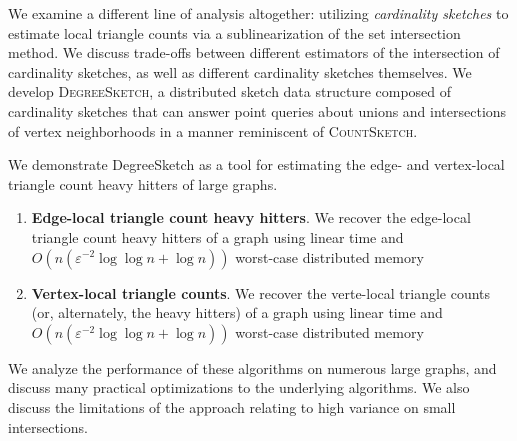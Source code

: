 \documentclass{report}
\newcommand{\algoname}[1]{\textnormal{\textsc{#1}}}
\begin{document}
We examine a different line of analysis altogether: utilizing \emph{cardinality sketches} to estimate local triangle counts via a sublinearization of the set intersection method.
We discuss trade-offs between different estimators of the intersection of cardinality sketches, as well as different cardinality sketches themselves.
We develop \algoname{DegreeSketch}, a distributed sketch data structure composed of cardinality sketches that can answer point queries about unions and intersections of vertex neighborhoods in a manner reminiscent of \algoname{CountSketch}.

We demonstrate DegreeSketch as a tool for estimating the edge- and vertex-local triangle count heavy hitters of large graphs. 
%
\begin{enumerate}
	\item \textbf{Edge-local triangle count heavy hitters}. We recover the edge-local triangle count heavy hitters of a graph using linear time and $O(n (\varepsilon^{-2} \log\log n + \log n))$ worst-case distributed memory
	\item \textbf{Vertex-local triangle counts}. We recover the verte-local triangle counts (or, alternately, the heavy hitters) of a graph using linear time and \\$O(n (\varepsilon^{-2} \log\log n + \log n))$ worst-case distributed memory
\end{enumerate}
%
We analyze the performance of these algorithms on numerous large graphs, and discuss many practical optimizations to the underlying algorithms. 
We also discuss the limitations of the approach relating to high variance on small intersections.
\end{document}
